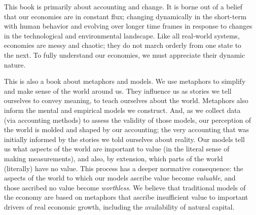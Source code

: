 


This book is primarily about accounting and change.
It is borne out of a belief that our economies are in constant flux;
changing dynamically in the short-term with human behavior
and evolving over longer time frames 
in response to changes in 
the technological and environmental landscape.
Like all real-world systems, 
economies are messy and chaotic;
they do not march orderly from one state to the next.
To fully understand our economies,
we must appreciate their dynamic nature.

This is also a book about metaphors and models.
We use metaphors to simplify and make sense of the world around us.
They influence us as stories we tell ourselves to convey meaning,
to teach ourselves about the world.
Metaphors also inform 
the mental and empirical models we construct.
And, as we collect data (via accounting methods) 
to assess the validity of those models,
our perception of the world is molded and shaped
by our accounting;
the very accounting that was initially informed
by the stories we told ourselves about reality.
Our models tell us what aspects of the world
are important to value 
(in the literal sense of making measurements),
and also, by extension, 
which parts of the world (literally) have no value.
This process has a deeper normative consequence: 
the aspects of the world to which our models ascribe
value become \emph{valuable},
and those ascribed no value become \emph{worthless}.
We believe that traditional models of the economy
are based on metaphors that ascribe insufficient value 
to important drivers of real economic growth,
including the availability of natural capital.


